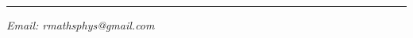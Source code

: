 \setcounter{page}{0}
\thispagestyle{fancy-blank}
\begingroup
\vspace*{35mm}
{\huge\bfseries\utitle\par}

\vspace*{5mm}
{\Large\usubtitle\par}

\vspace*{4mm}
{\rule{\linewidth}{0.5mm}\par}
\vspace*{4mm}

{\large\bfseries\uauthor\par}\vspace*{1mm}

{\large\itshape\uaffiliation\newline}
{\large\itshape\udate\newline}
{\large\itshape{Email: rmathsphys@gmail.com}\par}

\vfill
\endgroup
\clearpage
